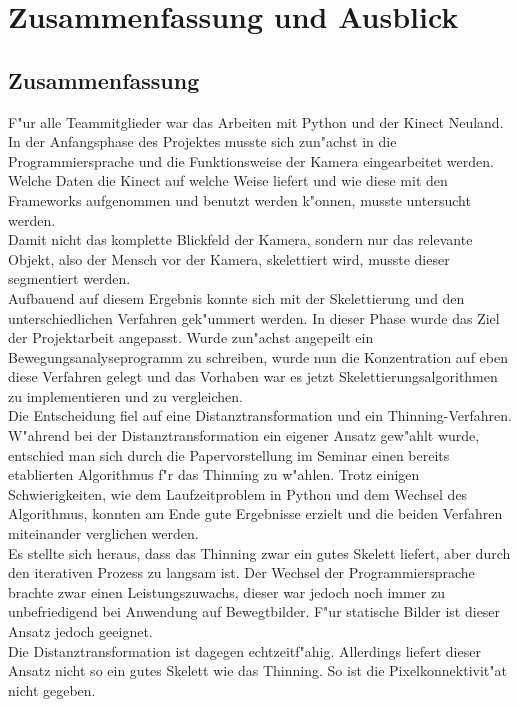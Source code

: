 \chapter{Zusammenfassung und Ausblick}
\label{ch:ausblick}
\section{Zusammenfassung}
F"ur alle Teammitglieder war das Arbeiten mit Python und der Kinect Neuland. In der Anfangsphase des Projektes musste sich zun"achst in die Programmiersprache und die Funktionsweise der Kamera eingearbeitet werden. Welche Daten die Kinect auf welche Weise liefert und wie diese mit den Frameworks aufgenommen und benutzt werden k"onnen, musste untersucht werden.\\
Damit nicht das komplette Blickfeld der Kamera, sondern nur das relevante Objekt, also der Mensch vor der Kamera, skelettiert wird, musste dieser segmentiert werden.\\Aufbauend auf diesem Ergebnis konnte sich mit der Skelettierung und den unterschiedlichen Verfahren gek"ummert werden. In dieser Phase wurde das Ziel der Projektarbeit angepasst. Wurde zun"achst angepeilt ein Bewegungsanalyseprogramm zu schreiben, wurde nun die Konzentration auf eben diese Verfahren gelegt und das Vorhaben war es jetzt Skelettierungsalgorithmen zu implementieren und zu vergleichen.\\Die Entscheidung fiel auf eine Distanztransformation und ein Thinning-Verfahren. W"ahrend bei der Distanztransformation ein eigener Ansatz gew"ahlt wurde, entschied man sich durch die Papervorstellung im Seminar einen bereits etablierten Algorithmus f"r das Thinning zu w"ahlen. Trotz einigen Schwierigkeiten, wie dem Laufzeitproblem in Python und dem Wechsel des Algorithmus, konnten am Ende gute Ergebnisse erzielt und die beiden Verfahren miteinander verglichen werden. \\
Es stellte sich heraus, dass das Thinning zwar ein gutes Skelett liefert, aber durch den iterativen Prozess zu langsam ist. Der Wechsel der Programmiersprache brachte zwar einen Leistungszuwachs, dieser war jedoch noch immer zu unbefriedigend bei Anwendung auf Bewegtbilder. F"ur statische Bilder ist dieser Ansatz jedoch geeignet. \\ Die Distanztransformation ist dagegen echtzeitf"ahig. Allerdings liefert dieser Ansatz nicht so ein gutes Skelett wie das Thinning. So ist die Pixelkonnektivit"at nicht gegeben. 
